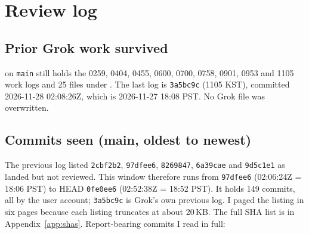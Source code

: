 \documentclass[11pt]{article}
\theoremstyle{definition}
\theoremstyle{remark}
\begin{document}
\section{Review log}
\subsection{Prior Grok work survived}
 on \texttt{main} still holds the 0259, 0404, 0455,
0600, 0700, 0758, 0901, 0953 and 1105 work logs and 25 files under . The last
log is \texttt{3a5bc9c} (1105 KST), committed 2026-11-28 02:08:26Z, which is
2026-11-27 18:08 PST. No Grok file was overwritten.

\subsection{Commits seen (main, oldest to newest)}
The previous log listed \texttt{2cbf2b2}, \texttt{97dfee6}, \texttt{8269847}, \texttt{6a39cae}
and \texttt{9d5c1e1} as landed but not reviewed. This window therefore runs from
\texttt{97dfee6} (02:06:24Z = 18:06 PST) to HEAD \texttt{0fe0ee6} (02:52:38Z = 18:52 PST).
It holds 149 commits, all by the user account; \texttt{3a5bc9c} is Grok's own previous log.
I paged the listing in six pages because each listing truncates at about 20\,KB. The full
SHA list is in Appendix~\ref{app:shas}. Report-bearing commits I read in full:
\end{document}
